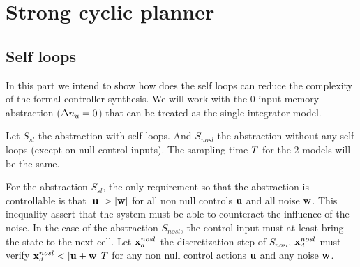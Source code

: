 \section{Strong cyclic planner}
%
%
\newcommand{\Snosl}{S_{nosl}}
\newcommand{\Ssl}{S_{sl}}
\newcommand{\xdsl}{\xd^{sl}}
\newcommand{\xdnosl}{\xd^{nosl}}

\subsection{Self loops}
In this part we intend to show how does the self loops can reduce the complexity of the formal controller synthesis.
We will work with the 0-input memory abstraction ($\Delta n_u=0$) that can be treated as the single integrator model.

Let $\Ssl$ the abstraction with self loops. And $\Snosl$ the abstraction without any self loops (except on null control inputs).
The sampling time $T$ for the 2 models will be the same.

For the abstraction $\Ssl$, the only requirement so that the abstraction is controllable is that $\abs{\u}>\abs{\w}$ for all non null controls $ \mathbf{u}$ and all noise $ \mathbf{w}$.
This inequality assert that the system must be able to counteract the influence of the noise.
In the case of the abstraction $\Snosl$, the control input must at least bring the state to the next cell.
Let $\xdnosl$ the discretization step of $\Snosl$, $\xdnosl$ must verify $\xdnosl<\abs{\u + \w}\dt$ for any non null control actions $ \mathbf{u}$ and any noise $ \mathbf{w}$. 


